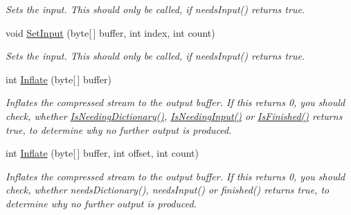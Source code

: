 \begin{DoxyCompactItemize}
\begin{DoxyCompactList}\small\item\em Sets the input. This should only be called, if needs\+Input() returns true. \end{DoxyCompactList}\item 
void \hyperlink{class_i_c_sharp_code_1_1_sharp_zip_lib_1_1_zip_1_1_compression_1_1_inflater_a9c0b4653fd574dc51dfa2975d9f9248a}{Set\+Input} (byte\mbox{[}$\,$\mbox{]} buffer, int index, int count)
\begin{DoxyCompactList}\small\item\em Sets the input. This should only be called, if needs\+Input() returns true. \end{DoxyCompactList}\item 
int \hyperlink{class_i_c_sharp_code_1_1_sharp_zip_lib_1_1_zip_1_1_compression_1_1_inflater_a73bfcbd5d20b4838bd28364fff12324e}{Inflate} (byte\mbox{[}$\,$\mbox{]} buffer)
\begin{DoxyCompactList}\small\item\em Inflates the compressed stream to the output buffer. If this returns 0, you should check, whether \hyperlink{class_i_c_sharp_code_1_1_sharp_zip_lib_1_1_zip_1_1_compression_1_1_inflater_a9db69836f41167ffd5e0d1dc5832594c}{Is\+Needing\+Dictionary()}, \hyperlink{class_i_c_sharp_code_1_1_sharp_zip_lib_1_1_zip_1_1_compression_1_1_inflater_a3033837c6e5987009c6bf51c4952a5fc}{Is\+Needing\+Input()} or \hyperlink{class_i_c_sharp_code_1_1_sharp_zip_lib_1_1_zip_1_1_compression_1_1_inflater_a0ade6f928ed3c7d1a9c8c9919c98141e}{Is\+Finished()} returns true, to determine why no further output is produced. \end{DoxyCompactList}\item 
int \hyperlink{class_i_c_sharp_code_1_1_sharp_zip_lib_1_1_zip_1_1_compression_1_1_inflater_aa77071f9ea123757cf11bae7b0fc4ea9}{Inflate} (byte\mbox{[}$\,$\mbox{]} buffer, int offset, int count)
\begin{DoxyCompactList}\small\item\em Inflates the compressed stream to the output buffer. If this returns 0, you should check, whether needs\+Dictionary(), needs\+Input() or finished() returns true, to determine why no further output is produced. \end{DoxyCompactList}\end{DoxyCompactItemize}
